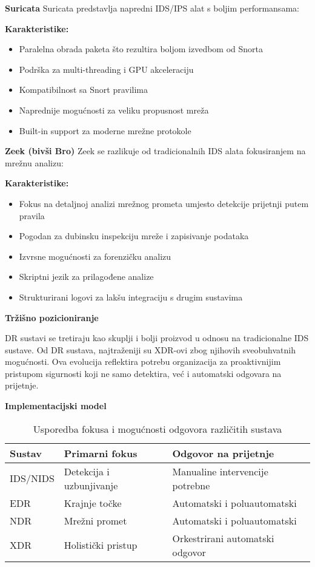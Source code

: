 \textbf{Suricata}
Suricata predstavlja napredni IDS/IPS alat s boljim performansama:

\textbf{Karakteristike:}
\begin{itemize}
\item Paralelna obrada paketa što rezultira boljom izvedbom od Snorta
\item Podrška za multi-threading i GPU akceleraciju
\item Kompatibilnost sa Snort pravilima
\item Naprednije mogućnosti za veliku propusnost mreža
\item Built-in support za moderne mrežne protokole
\end{itemize}

\textbf{Zeek (bivši Bro)}
Zeek se razlikuje od tradicionalnih IDS alata fokusiranjem na mrežnu analizu:

\textbf{Karakteristike:}
\begin{itemize}
\item Fokus na detaljnoj analizi mrežnog prometa umjesto detekcije prijetnji putem pravila
\item Pogodan za dubinsku inspekciju mreže i zapisivanje podataka
\item Izvrsne mogućnosti za forenzičku analizu
\item Skriptni jezik za prilagođene analize
\item Strukturirani logovi za lakšu integraciju s drugim sustavima
\end{itemize}

\textbf{Tržišno pozicioniranje}

DR sustavi se tretiraju kao skuplji i bolji proizvod u odnosu na tradicionalne IDS sustave. Od DR sustava, najtraženiji su XDR-ovi zbog njihovih sveobuhvatnih mogućnosti. Ova evolucija reflektira potrebu organizacija za proaktivnijim pristupom sigurnosti koji ne samo detektira, već i automatski odgovara na prijetnje.

\textbf{Implementacijski model}

\begin{table}[h]
\centering
\begin{tabular}{|l|p{4cm}|p{4cm}|}
\hline
\textbf{Sustav} & \textbf{Primarni fokus} & \textbf{Odgovor na prijetnje} \\
\hline
IDS/NIDS & Detekcija i uzbunjivanje & Manualine intervencije potrebne \\
\hline
EDR & Krajnje točke & Automatski i poluautomatski \\
\hline
NDR & Mrežni promet & Automatski i poluautomatski \\
\hline
XDR & Holistički pristup & Orkestrirani automatski odgovor \\
\hline
\end{tabular}
\caption{Usporedba fokusa i mogućnosti odgovora različitih sustava}
\end{table}

